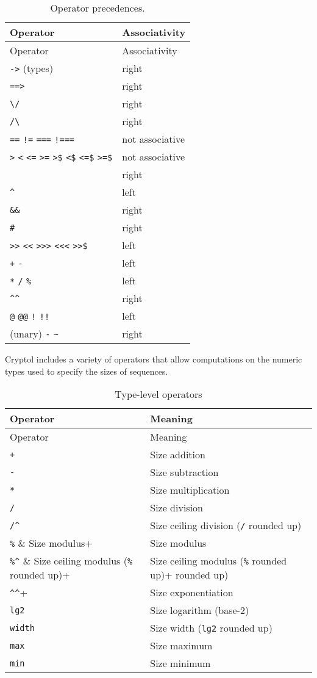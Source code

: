 \begin{longtable}[c]{@{}ll@{}}
\caption{Operator precedences.}\tabularnewline
\toprule
Operator & Associativity\tabularnewline
\midrule
\endfirsthead
\toprule
Operator & Associativity\tabularnewline
\midrule
\endhead
\texttt{-\textgreater{}} (types) & right\tabularnewline
\texttt{==\textgreater{}} & right\tabularnewline
\texttt{\textbackslash{}/} & right\tabularnewline
\texttt{/\textbackslash{}} & right\tabularnewline
\texttt{==} \texttt{!=} \texttt{===} \texttt{!===} & not associative\tabularnewline
\texttt{\textgreater{}} \texttt{\textless{}} \texttt{\textless{}=} \texttt{\textgreater{}=}
\texttt{\textgreater{}\$} \texttt{\textless{}\$} \texttt{\textless{}=\$} \texttt{\textgreater{}=\$}
& not associative\tabularnewline
\texttt{\textbar{}\textbar{}} & right\tabularnewline
\texttt{\^{}} & left\tabularnewline
\texttt{\&\&} & right\tabularnewline
\texttt{\#} & right\tabularnewline
\texttt{\textgreater{}\textgreater{}} \texttt{\textless{}\textless{}}
\texttt{\textgreater{}\textgreater{}\textgreater{}}
\texttt{\textless{}\textless{}\textless{}}
\texttt{\textgreater{}\textgreater{}\$} & left\tabularnewline
\texttt{+} \texttt{-} & left\tabularnewline
\texttt{*} \texttt{/} \texttt{\%} & left\tabularnewline
\texttt{\^{}\^{}} & right\tabularnewline
\texttt{@} \texttt{@@} \texttt{!} \texttt{!!} & left\tabularnewline
(unary) \texttt{-} \texttt{\textasciitilde{}} & right\tabularnewline
\bottomrule
\end{longtable}


Cryptol includes a variety of operators that allow computations on
the numeric types used to specify the sizes of sequences.

\begin{longtable}[c]{@{}ll@{}}
\caption{Type-level operators}\tabularnewline
\toprule
Operator & Meaning\tabularnewline
\midrule
\endfirsthead
\toprule
Operator & Meaning\tabularnewline
\midrule
\endhead
\texttt{+} & Size addition\tabularnewline
\texttt{-} & Size subtraction\tabularnewline
\texttt{*} & Size multiplication\tabularnewline
\texttt{/} & Size division\tabularnewline
\verb+/^+ & Size ceiling division (\texttt{/} rounded up)\tabularnewline
\verb+%+ & Size modulus\tabularnewline
\verb+%^+ & Size ceiling modulus (\verb+%+ rounded up)\tabularnewline
\verb+^^+ & Size exponentiation\tabularnewline
\texttt{lg2} & Size logarithm (base-2)\tabularnewline
\texttt{width} & Size width (\texttt{lg2} rounded up)\tabularnewline
\texttt{max} & Size maximum\tabularnewline
\texttt{min} & Size minimum\tabularnewline
\bottomrule
\end{longtable}

